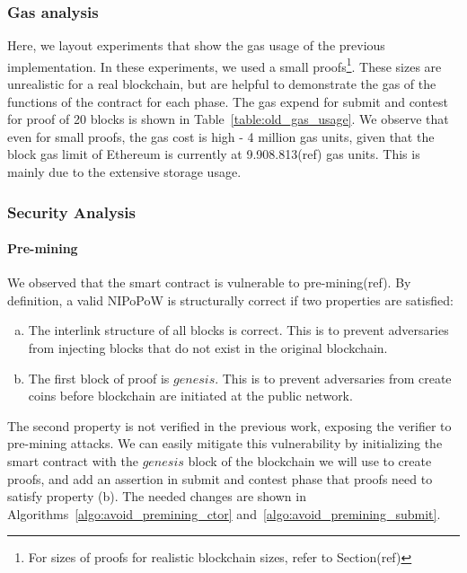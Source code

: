

\subsubsection{Gas analysis}

Here, we layout experiments that show the gas usage of the previous
implementation. In these experiments, we used a small proofs\footnote{For
sizes of proofs for realistic blockchain sizes, refer to Section(ref)}. These
sizes are unrealistic for a real blockchain, but are helpful to demonstrate the
gas of the functions of the contract for each phase. The gas expend for submit
and contest for proof of 20 blocks is shown in Table~\ref{table:old_gas_usage}.
We observe that even for small proofs, the gas cost is high - 4 million gas
units, given that the block gas limit of Ethereum is currently at
9.908.813(ref) gas units. This is mainly due to the extensive storage usage.



\subsubsection{Security Analysis}

\paragraph{Pre-mining} We observed that the smart contract is vulnerable to
pre-mining(ref). By definition, a valid NIPoPoW is structurally correct if two
properties are satisfied:

\begin{enumerate}[(a)]

\item The interlink structure of all blocks is correct. This is to prevent
    adversaries from injecting blocks that do not exist in the original
    blockchain.

\item The first block of proof is $genesis$. This is to prevent adversaries
    from create coins before blockchain are initiated at the public network.

\end{enumerate}

The second property is not verified in the previous work, exposing the verifier
to pre-mining attacks. We can easily mitigate this vulnerability by
initializing the smart contract with the $genesis$ block of the blockchain we
will use to create proofs, and add an assertion in submit and contest phase
that proofs need to satisfy property (b). The needed changes are shown in
Algorithms~\ref{algo:avoid_premining_ctor}
and~\ref{algo:avoid_premining_submit}.

